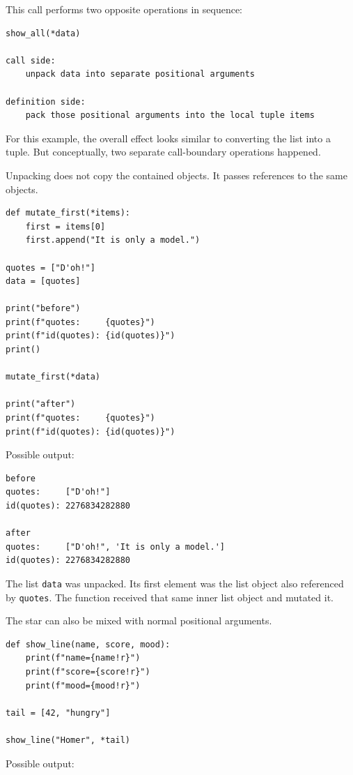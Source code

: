 This call performs two opposite operations in sequence:

\begin{verbatim}
show_all(*data)

call side:
    unpack data into separate positional arguments

definition side:
    pack those positional arguments into the local tuple items
\end{verbatim}

For this example, the overall effect looks similar to converting the list into a tuple. But conceptually, two separate call-boundary operations happened.

Unpacking does not copy the contained objects. It passes references to the same objects.

\begin{verbatim}
def mutate_first(*items):
    first = items[0]
    first.append("It is only a model.")

quotes = ["D'oh!"]
data = [quotes]

print("before")
print(f"quotes:     {quotes}")
print(f"id(quotes): {id(quotes)}")
print()

mutate_first(*data)

print("after")
print(f"quotes:     {quotes}")
print(f"id(quotes): {id(quotes)}")
\end{verbatim}

Possible output:

\begin{verbatim}
before
quotes:     ["D'oh!"]
id(quotes): 2276834282880

after
quotes:     ["D'oh!", 'It is only a model.']
id(quotes): 2276834282880
\end{verbatim}

The list \texttt{data} was unpacked. Its first element was the list object also referenced by \texttt{quotes}. The function received that same inner list object and mutated it.

The star can also be mixed with normal positional arguments.

\begin{verbatim}
def show_line(name, score, mood):
    print(f"name={name!r}")
    print(f"score={score!r}")
    print(f"mood={mood!r}")

tail = [42, "hungry"]

show_line("Homer", *tail)
\end{verbatim}

Possible output:

